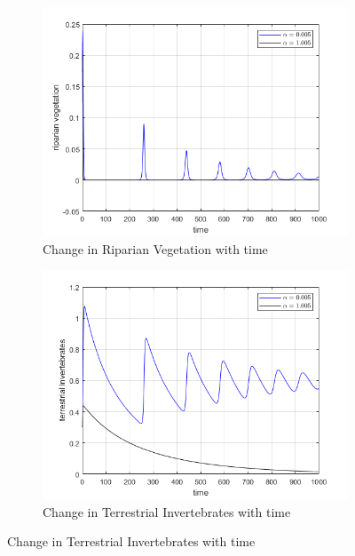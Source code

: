 \documentclass[12pt]{article}
\numberwithin{equation}{section}
\begin{document}
\FloatBarrier
\begin{figure}[bp!]
	\centering
	\begin{subfigure}[t]{0.45\textwidth}
		\centering
	\includegraphics[width=\textwidth]{time_vs_riparian_alpha.png}
		\caption{Change in Riparian Vegetation with time} \label{fig:time_vs_riparian_alpha}
	\end{subfigure}
\hspace{0.08\textwidth}
        \begin{subfigure}[t]{0.45\textwidth}
                 \centering
         \includegraphics[width=\textwidth]{time_vs_invertebrates_alpha.png}
		\caption{Change in Terrestrial Invertebrates with time} \label{fig:time_vs_invertebrates_alpha}

\end{subfigure}
\end{figure}
\end{document}
